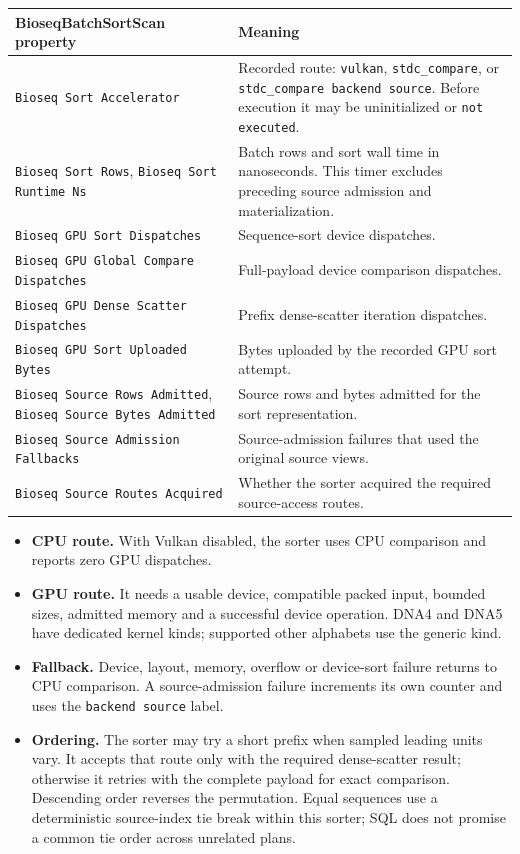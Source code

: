 \begingroup\small
\begin{longtable}{@{}p{.49\linewidth}p{.46\linewidth}@{}}
\toprule
\textbf{BioseqBatchSortScan property} & \textbf{Meaning}\\
\midrule\endhead
\texttt{Bioseq Sort Accelerator} & Recorded route: \texttt{vulkan},
\texttt{stdc\_compare}, or
\texttt{stdc\_compare backend source}. Before execution it may be
uninitialized or \texttt{not executed}.\\
\texttt{Bioseq Sort Rows}, \texttt{Bioseq Sort Runtime Ns} & Batch rows
and sort wall time in nanoseconds. This timer excludes preceding source
admission and materialization.\\
\texttt{Bioseq GPU Sort Dispatches} & Sequence-sort device dispatches.\\
\texttt{Bioseq GPU Global Compare Dispatches} & Full-payload device
comparison dispatches.\\
\texttt{Bioseq GPU Dense Scatter Dispatches} & Prefix dense-scatter
iteration dispatches.\\
\texttt{Bioseq GPU Sort Uploaded Bytes} & Bytes uploaded by the recorded
GPU sort attempt.\\
\texttt{Bioseq Source Rows Admitted}, \texttt{Bioseq Source Bytes Admitted}
& Source rows and bytes admitted for the sort representation.\\
\texttt{Bioseq Source Admission Fallbacks} & Source-admission failures
that used the original source views.\\
\texttt{Bioseq Source Routes Acquired} & Whether the sorter acquired the
required source-access routes.\\
\bottomrule
\end{longtable}
\endgroup

\begin{itemize}
  \item \textbf{CPU route.} With Vulkan disabled, the sorter uses CPU
    comparison and reports zero GPU dispatches.
  \item \textbf{GPU route.} It needs a usable device, compatible packed
    input, bounded sizes, admitted memory and a successful device operation.
    DNA4 and DNA5 have dedicated kernel kinds; supported other alphabets use
    the generic kind.
  \item \textbf{Fallback.} Device, layout, memory, overflow or device-sort
    failure returns to CPU comparison. A source-admission failure increments
    its own counter and uses the \texttt{backend source} label.
  \item \textbf{Ordering.} The sorter may try a short prefix when sampled
    leading units vary. It accepts that route only with the required
    dense-scatter result; otherwise it retries with the complete payload for
    exact comparison. Descending order reverses the permutation. Equal
    sequences use a deterministic source-index tie break within this sorter;
    SQL does not promise a common tie order across unrelated plans.
\end{itemize}

